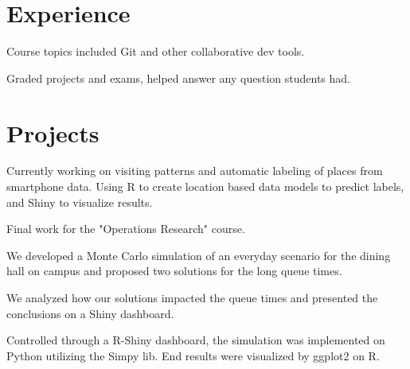 \documentclass[]{deedy-resume-openfont}
\begin{document}
\begin{minipage}[t]{0.66\textwidth} 


\section{Experience}

\vspace{\topsep}
\begin{tightemize}
\item Course topics included Git and other collaborative dev tools.
\item Graded projects and exams, helped answer any question students had. 
\end{tightemize}
\sectionsep

\section{Projects}

\begin{tightemize}
\item Currently working on visiting patterns and
automatic labeling of places from smartphone data. Using R to create location based data models to predict labels, and Shiny to visualize results.
\end{tightemize}
\sectionsep

\begin{tightemize}
\item Final work for the "Operations Research" course.
\item We developed a Monte Carlo simulation of an everyday scenario for the dining hall on campus and proposed two solutions for the long queue times.
\item We analyzed how our solutions impacted the queue times and presented the conclusions on a Shiny dashboard.
\item Controlled through a R-Shiny dashboard, the simulation was implemented on Python utilizing the Simpy lib. End results were visualized by ggplot2 on R.
\end{tightemize}
\sectionsep


\end{minipage}
\end{document}
